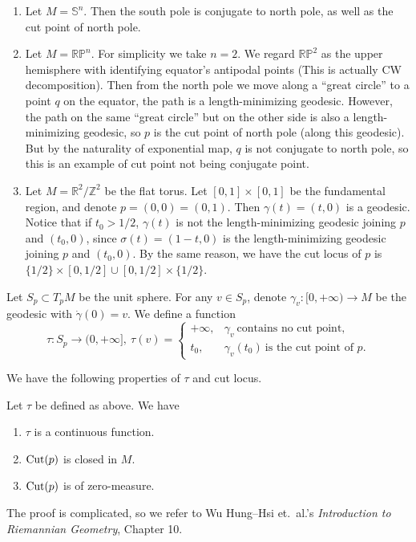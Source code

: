 \begin{eg}\label{eg of cut pts}
    \begin{enumerate}[(1)]
        \item Let $M=\mathbb{S}^n$.
        Then the south pole is conjugate to north pole, as well as the cut point of north pole.
        \item Let $M=\mathbb{RP}^n$.
        For simplicity we take $n=2$.
        We regard $\mathbb{RP}^2$ as the upper hemisphere with identifying equator's antipodal points (This is actually CW decomposition).
        Then from the north pole we move along a ``great circle'' to a point $q$ on the equator, the path is a length-minimizing geodesic.
        However, the path on the same ``great circle'' but on the other side is also a length-minimizing geodesic, so $p$ is the cut point of north pole (along this geodesic).
        But by the naturality of exponential map, $q$ is not conjugate to north pole, so this is an example of cut point not being conjugate point.
        \item Let $M=\mathbb{R}^2/\mathbb{Z}^2$ be the flat torus.
        Let $[0,1]\times[0,1]$ be the fundamental region, and denote $p=(0,0)=(0,1)$.
        Then $\gamma(t)=(t,0)$ is a geodesic.
        Notice that if $t_0>1/2$, $\gamma(t)$ is not the length-minimizing geodesic joining $p$ and $(t_0,0)$, since $\sigma(t)=(1-t,0)$ is the length-minimizing geodesic joining $p$ and $(t_0,0)$.
        By the same reason, we have the cut locus of $p$ is $\{1/2\}\times[0,1/2]\cup[0,1/2]\times\{1/2\}$.
    \end{enumerate}
\end{eg}

Let $S_p\subset T_pM$ be the unit sphere.
For any $v\in S_p$, denote $\gamma_v:[0,+\infty)\to M$ be the geodesic with $\dot{\gamma}(0)=v$.
We define a function
\[\tau:S_p\to(0,+\infty],\ \tau(v)=\begin{cases}
    +\infty, & \gamma_v\ \text{contains no cut point},\\
    t_0, & \gamma_v(t_0)\ \text{is the cut point of }p.
\end{cases}\]

We have the following properties of $\tau$ and cut locus.
\begin{prop}
    Let $\tau$ be defined as above. We have
    \begin{enumerate}[(1)]
        \item $\tau$ is a continuous function.
        \item $\operatorname{Cut}(p)$ is closed in $M$.
        \item $\operatorname{Cut}(p)$ is of zero-measure.
    \end{enumerate}
\end{prop}
The proof is complicated, so we refer to Wu Hung--Hsi et.\ al.'s \emph{Introduction to Riemannian Geometry}, Chapter 10.


